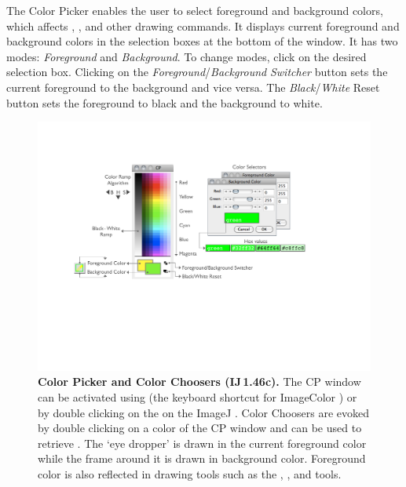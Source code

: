 The
Color Picker \cite{C-CP} enables the user to select foreground and
background colors, which affects ,
, 
and other drawing commands. It displays current foreground and background
colors in the selection boxes at the bottom of the window. It has
two modes: \emph{Foreground} and \emph{Background}. To change modes,
click on the desired selection box. Clicking on the \emph{Foreground}/\emph{Background}
\emph{Switcher} button sets the current foreground to the background
and vice versa. The \emph{Black}/\emph{White} Reset button sets the
foreground to black and the background to white.
\begin{figure}[h]
\noindent \includegraphics[width=0.9\columnwidth]{images/CP}\caption[Color Picker window]{\textbf{\label{fig:CPtool}Color Picker and Color Choosers (IJ\,1.46c).}
The CP window can be activated using \protect{}
\protect{} (the keyboard shortcut for Image\lyxarrow{}Color\lyxarrow{}
\textsf{}) or by double clicking
on the  on the ImageJ .
Color Choosers are evoked by double clicking on a color of the CP
window and can be used to retrieve . The `eye
dropper' is drawn in the current foreground color while the frame
around it is drawn in background color. Foreground color is also reflected
in drawing tools such as the , ,
 and  tools.}
\end{figure}


